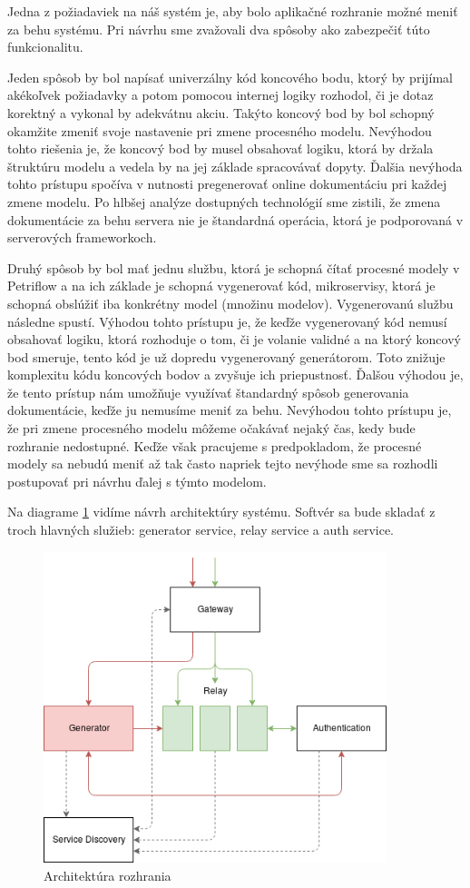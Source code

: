 Jedna z požiadaviek na náš systém je, aby bolo aplikačné rozhranie možné meniť za behu systému. Pri návrhu sme zvažovali dva spôsoby ako zabezpečiť túto funkcionalitu.

Jeden spôsob by bol napísať univerzálny kód koncového bodu, ktorý by prijímal  akékoľvek požiadavky a potom pomocou internej logiky rozhodol, či je dotaz korektný a vykonal by adekvátnu akciu.  Takýto koncový bod by bol schopný okamžite zmeniť svoje nastavenie pri zmene procesného modelu. Nevýhodou tohto riešenia je, že koncový bod by musel obsahovať logiku, ktorá by držala štruktúru modelu a vedela by na jej základe spracovávať dopyty. Ďalšia nevýhoda tohto prístupu spočíva v nutnosti pregenerovať online dokumentáciu pri každej zmene modelu. Po hlbšej analýze dostupných technológií sme zistili, že zmena dokumentácie za behu servera nie je štandardná operácia, ktorá je podporovaná v serverových frameworkoch. 

Druhý spôsob by bol mať jednu službu, ktorá je schopná čítať procesné modely v Petriflow a na ich základe je schopná vygenerovať kód, mikroservisy, ktorá je schopná obslúžiť iba konkrétny model (množinu modelov).  Vygenerovanú službu následne spustí.
Výhodou tohto prístupu je, že keďže vygenerovaný kód nemusí obsahovať logiku, ktorá rozhoduje o tom, či je volanie validné a na ktorý koncový bod smeruje, tento kód je už dopredu vygenerovaný generátorom. Toto znižuje komplexitu kódu koncových bodov a zvyšuje ich priepustnosť. Ďalšou výhodou je, že tento prístup nám umožňuje využívať štandardný spôsob generovania dokumentácie, keďže ju nemusíme meniť za behu. Nevýhodou tohto prístupu je, že pri zmene procesného modelu môžeme očakávať nejaký čas, kedy bude rozhranie nedostupné. Keďže však pracujeme s predpokladom, že procesné modely sa nebudú meniť až tak často napriek tejto nevýhode sme sa rozhodli postupovať pri návrhu ďalej s týmto modelom. 

Na diagrame \ref{architecture} vidíme návrh architektúry systému. Softvér sa bude skladať z troch hlavných služieb: generator service, relay service a auth service. 
\begin{figure}[!htbp]
	\centering
	\includegraphics[width=10cm]{img/architecture.png}
	\caption{Architektúra rozhrania}
	\label{architecture}
\end{figure}

